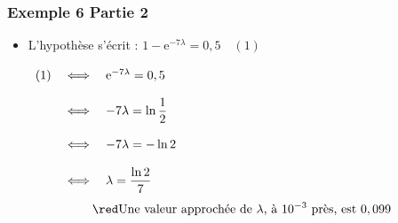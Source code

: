 \documentclass[xcolor=svgnames,t,final]{beamer}
\begin{document}
\begin{frame}


\frametitle{Exemple 6 Partie 2}


\begin{itemize}
\item L'hypothèse s'écrit : $1-\text{e}^{-7\lambda}=0,5\quad (1)$

$\begin{array}[t]{lcl}
(1)&\iff&\text{e}^{-7\lambda}=0,5\\
&&\\
&\iff&-7\lambda=\ln \dfrac{1}{2} \\
&&\\
&\iff&-7\lambda=-\ln 2 \\
&&\\
&\iff&\lambda=\dfrac{\ln 2}{7}
\end{array}$
\[\red \text{Une valeur approchée de }\lambda\text{, à  }10^{-3}\text{ près, est } 0,099\]
%
%

\end{itemize}


\end{frame}
\end{document}
